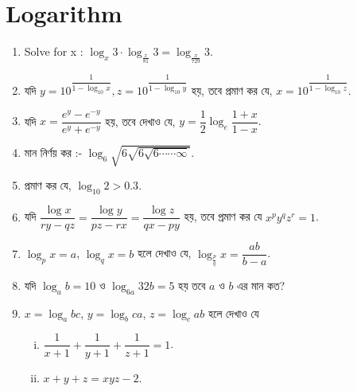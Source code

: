 \documentclass[11pt, a4paper]{article}
\begin{document}
\tableofcontents
\pagebreak


	
\section{Logarithm}

\begin{enumerate}


     \item Solve for x : $ \log_x 3 \cdot \log_{\frac{x}{81}} 3 = \log_{\frac{x}{729}} 3. $

	\item \textbengali{যদি} 
		$ y= 10 ^ {\dfrac{1}{1-\log_{10} x}}, z= 10 ^ {\dfrac{1}{1-\log_{10} y}} $ 
		\textbengali{হয়, তবে প্রমাণ কর যে,}
		$ x= 10 ^ {\dfrac{1}{1-\log_{10} z}}.$
 
     \item \textbengali {যদি} $ x = \dfrac{e^y - e^{-y}}{e^y + e^{-y}} $ \textbengali {হয়, তবে দেখাও যে,} $ y = \dfrac{1}{2} \log_e \dfrac{1+x}{1-x}. $
     

     \item \textbengali{মান নির্ণয় কর }:- $ \log_6 \sqrt{6\sqrt{6\sqrt{6 \cdots \cdots \infty}}}. $
     
     \item \textbengali{প্রমাণ কর যে,} $ \log_{10} 2 > 0.3 $.
     
     \item \textbengali {যদি} $ \dfrac{\log x}{ry - qz} = \dfrac{\log y}{pz - rx} = \dfrac{\log z}{qx - py} $ \textbengali{হয়, তবে প্রমাণ কর যে} $ x^p y^q z^r = 1 $.
     
     \item $ \log_p x = a $, $ \log_q x = b $ \textbengali{হলে দেখাও যে,} $ \log_{\frac{p}{q}} x = \dfrac{ab}{b-a} $.
     
     \item \textbengali{যদি} $ \log_a b = 10 $ \textbengali{ও} $ \log_{6a} 32b = 5 $ \textbengali{হয় তবে} $a$ \textbengali{ও} $b$ \textbengali{এর মান কত?}
     
     \item $ x = \log_a bc$, $ y = \log_b ca $, $ z = \log_c ab $ \textbengali{হলে দেখাও যে}
     		\begin{enumerate}[(i)]
     		\item $ \dfrac{1}{x+1} + \dfrac{1}{y+1} + \dfrac{1}{z+1} = 1 $.
     		\item $ x+y+z = xyz - 2 $.
     		\end{enumerate}
     		

\end{enumerate}
\end{document}
